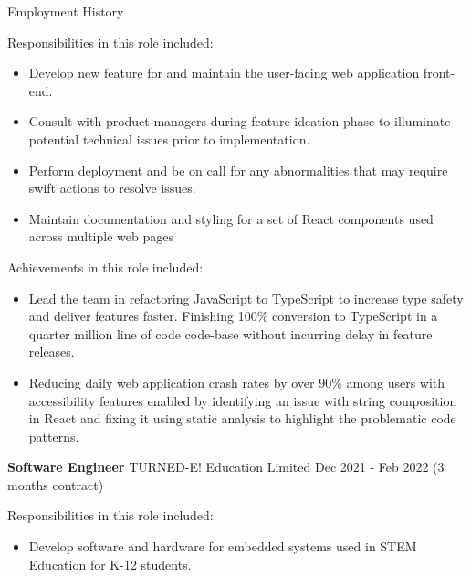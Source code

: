 \documentclass{resume} %
\begin{document}
\begin{rSection}{Employment History}
    \hspace*{1cm}%
    \begin{minipage}{.8\textwidth}%
        
        Responsibilities in this role included:
        \begin{itemize}
            \item Develop new feature for and maintain the user-facing web application front-end.
            \item Consult with product managers during feature ideation phase to illuminate potential technical issues prior to implementation.
            \item Perform deployment and be on call for any abnormalities that may require swift actions to resolve issues.
            \item Maintain documentation and styling for a set of React components used across multiple web pages
        \end{itemize}
        
        Achievements in this role included:
        \begin{itemize}
            \item Lead the team in refactoring JavaScript to TypeScript to increase type safety and deliver features faster. Finishing 100\% conversion to TypeScript in a quarter million line of code code-base without incurring delay in feature releases.
            \item Reducing daily web application crash rates by over 90\% among users with accessibility features enabled by identifying an issue with string composition in React and fixing it using static analysis to highlight the problematic code patterns.
        \end{itemize}
    \end{minipage}%
    
    \clearpage
    
    \item \textbf{Software Engineer} {TURNED-E! Education Limited} \hfill Dec 2021 - Feb 2022 (3 months contract) \\
    
    \hspace*{1cm}%
    \begin{minipage}{.8\textwidth}%
        
        Responsibilities in this role included:
        \begin{itemize}
            \item Develop software and hardware for embedded systems used in STEM Education for K-12 students.
        \end{itemize}
        

\end{minipage}
\end{rSection}
\end{document}
